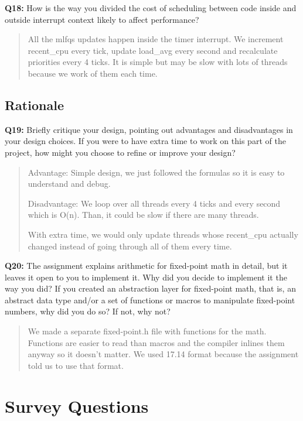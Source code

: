 \documentclass[a4paper,11pt]{paper}
\begin{document}
\textbf{Q18:} How is the way you divided the cost of scheduling between code
inside and outside interrupt context likely to affect performance?

\begin{quote}
All the mlfqs updates happen inside the timer interrupt. We increment recent\_cpu every tick, 
update load\_avg every second and recalculate priorities every 4 ticks. 
It is simple but may be slow with lots of threads because we work of them each time.
\end{quote}

\subsection{Rationale}

\textbf{Q19:} Briefly critique your design, pointing out advantages and
disadvantages in your design choices. If you were to have extra time to work on
this part of the project, how might you choose to refine or improve your design?

\begin{quote}
Advantage: Simple design, we just followed the formulas 
so it is easy to understand and debug.

Disadvantage: We loop over all threads every 4 ticks and every second 
which is O(n). Than, it could be slow if there are many threads.

With extra time, we would only update threads whose recent\_cpu actually 
changed instead of going through all of them every time.
\end{quote}

\textbf{Q20:} The assignment explains arithmetic for fixed-point math in detail,
but it leaves it open to you to implement it.  Why did you decide to implement
it the way you did?  If you created an abstraction layer for fixed-point math,
that is, an abstract data type and/or a set of functions or macros to manipulate
fixed-point numbers, why did you do so?  If not, why not?

\begin{quote}
We made a separate fixed-point.h file with functions for the math. 
Functions are easier to read than macros and the compiler inlines 
them anyway so it doesn't matter. We used 17.14 format because the 
assignment told us to use that format.
\end{quote}

\section{Survey Questions}
\end{document}
